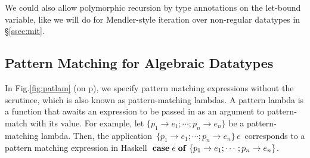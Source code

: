 \documentclass[runningheads,a4paper]{llncs}
\begin{document}
We could also allow polymorphic recursion by type annotations
on the let-bound variable, like we will do for Mendler-style iteration
over non-regular datatypes in \S\ref{ssec:mit}.


\subsection{Pattern Matching for Algebraic Datatypes}\label{ssec:patlam}
In Fig.\ref{fig:patlam} (on p\pageref{fig:patlam}), we specify
pattern matching expressions without the scrutinee, which is
also known as pattern-matching lambdas. A pattern lambda is
a function that awaits an expression to be passed in
as an argument to pattern-match with its value. For example,
let $\{p_1\to e_1;\cdots; p_n\to e_n\}$ be a pattern-matching lambda.
Then, the application $\,\{p_1\to e_1;\cdots; p_n\to e_n\}\,e\,$
corresponds to a pattern matching expression in Haskell
${\bf\;case}\;e\;{\bf of}\;\{p_1\to e_1;\cdots; p_n\to e_n\}$.
\end{document}
